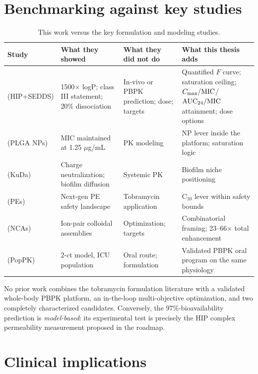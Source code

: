 \section{Benchmarking against key studies}
\begin{table}[htbp]
\centering
\caption{This work versus the key formulation and modeling studies.}
\label{tab:benchmark}
\small
\begin{tabular}{p{2.6cm}p{3.8cm}p{3.4cm}p{3.8cm}}
\toprule
Study & What they showed & What they did not do & What this thesis adds \\
\midrule
\citet{Asad2023} (HIP+SEDDS) & 1500$\times$ logP; class III statement; 20\% dissociation & In-vivo or PBPK prediction; dose; targets & Quantified $F$ curve; saturation ceiling; $C_{\max}/\mathrm{MIC}$/$\mathrm{AUC}_{24}/\mathrm{MIC}$ attainment; dose options \\
\citet{Hill2019} (PLGA NPs) & MIC maintained at 1.25 $\mu$g/mL & PK modeling & NP lever inside the platform; saturation logic \\
\citet{BlancoCabra2022} (KuDa) & Charge neutralization; biofilm diffusion & Systemic PK & Biofilm niche positioning \\
\citet{Bohley2024} (PEs) & Next-gen PE safety landscape & Tobramycin application & C$_{10}$ lever within safety bounds \\
\citet{Khaled2026} (NCAs) & Ion-pair colloidal assemblies & Optimization; targets & Combinatorial framing; 23--66$\times$ total enhancement \\
\citet{Li2021} (PopPK) & 2-ct model, ICU population & Oral route; formulation & Validated PBPK oral program on the same physiology \\
\bottomrule
\end{tabular}
\end{table}

No prior work combines the tobramycin formulation literature with a validated whole-body PBPK platform, an in-the-loop multi-objective optimization, and two completely characterized candidates. Conversely, the 97\%-bioavailability prediction is \emph{model-based}: its experimental test is precisely the HIP complex permeability measurement proposed in the roadmap.

\section{Clinical implications}
\label{sec:clinical-impl}

